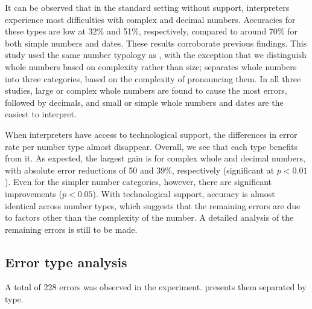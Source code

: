 \documentclass[output=paper]{langsci/langscibook}
\begin{document}
It can be observed that in the standard setting without support, interpreters experience most difficulties with complex and decimal numbers. Accuracies for these types are low at 32\% and 51\%, respectively, compared to around 70\% for both simple numbers and dates. These results corroborate previous findings. This study used the same number typology as \citet{Mazza2001}, with the exception that we distinguish whole numbers based on complexity rather than size; \citet{Pinochi2009} separates whole numbers into three categories, based on the complexity of pronouncing them. In all three studies, large or complex whole numbers are found to cause the most errors, followed by decimals, and small or simple whole numbers and dates are the easiest to interpret.

When interpreters have access to technological support, the differences in error rate per number type almost disappear. Overall, we see that each type benefits from it. As expected, the largest gain is for complex whole and decimal numbers, with absolute error reductions of 50 and 39\%, respectively (significant at $p < 0.01$). Even for the simpler number categories, however, there are significant improvements ($p < 0.05$). With technological support, accuracy is almost identical across number types, which suggests that the remaining errors are due to factors other than the complexity of the number. A detailed analysis of the remaining errors is still to be made.   

\subsection{Error type analysis}

A total of 228 errors was observed in the experiment.  presents them separated by type.
\end{document}

